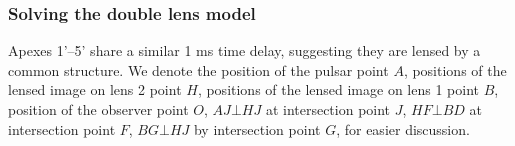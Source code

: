 \documentclass[useAMS,usenatbib]{mn2e}
\begin{document}
\subsubsection{Solving the double lens model}

Apexes 1'--5' share a similar 1 ms time delay, suggesting they are lensed by
a common structure.
We denote the position of the pulsar point $A$, positions of the lensed image on lens 2 point $H$, positions of the lensed image on lens 1 point $B$, position of the observer point $O$, $AJ\bot HJ$ at intersection point $J$, $HF\bot BD$ at intersection point $F$, $BG\bot HJ$ by intersection point $G$, for easier discussion.

\end{document}
